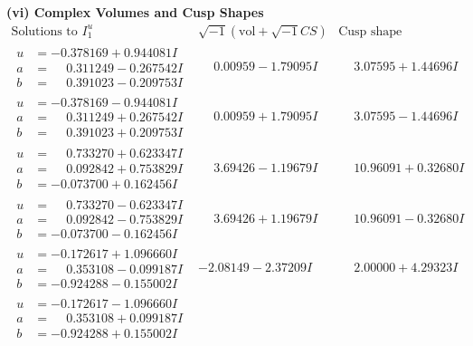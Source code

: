 \documentclass[1p]{elsarticle_modified}
\theoremstyle{definition}
\newcommand{\I}{\sqrt{-1}}
\begin{document}
\newpage\flushleft \textbf{(vi) Complex Volumes and Cusp Shapes}
$$\begin{array}{c|c|c}  
\text{Solutions to }I^u_{1}& \I (\text{vol} + \sqrt{-1}CS) & \text{Cusp shape}\\
 \hline 
\begin{aligned}
u &= -0.378169 + 0.944081 I \\
a &= \phantom{-}0.311249 - 0.267542 I \\
b &= \phantom{-}0.391023 - 0.209753 I\end{aligned}
 & \phantom{-}0.00959 - 1.79095 I & \phantom{-}3.07595 + 1.44696 I \\ \hline\begin{aligned}
u &= -0.378169 - 0.944081 I \\
a &= \phantom{-}0.311249 + 0.267542 I \\
b &= \phantom{-}0.391023 + 0.209753 I\end{aligned}
 & \phantom{-}0.00959 + 1.79095 I & \phantom{-}3.07595 - 1.44696 I \\ \hline\begin{aligned}
u &= \phantom{-}0.733270 + 0.623347 I \\
a &= \phantom{-}0.092842 + 0.753829 I \\
b &= -0.073700 + 0.162456 I\end{aligned}
 & \phantom{-}3.69426 - 1.19679 I & \phantom{-}10.96091 + 0.32680 I \\ \hline\begin{aligned}
u &= \phantom{-}0.733270 - 0.623347 I \\
a &= \phantom{-}0.092842 - 0.753829 I \\
b &= -0.073700 - 0.162456 I\end{aligned}
 & \phantom{-}3.69426 + 1.19679 I & \phantom{-}10.96091 - 0.32680 I \\ \hline\begin{aligned}
u &= -0.172617 + 1.096660 I \\
a &= \phantom{-}0.353108 - 0.099187 I \\
b &= -0.924288 - 0.155002 I\end{aligned}
 & -2.08149 - 2.37209 I & \phantom{-}2.00000 + 4.29323 I \\ \hline\begin{aligned}
u &= -0.172617 - 1.096660 I \\
a &= \phantom{-}0.353108 + 0.099187 I \\
b &= -0.924288 + 0.155002 I\end{aligned}

\end{array}$$
\end{document}

